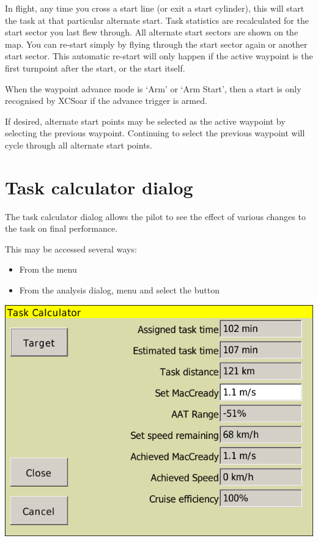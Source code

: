 \documentclass[a4paper,12pt]{refrep}
\begin{document}
  In flight, any time you cross a start line (or exit a start
  cylinder), this will start the task at that particular alternate
  start.  Task statistics are recalculated for the start sector you
  last flew through.  All alternate start sectors are shown on the
  map.  You can re-start simply by flying through the start sector
  again or another start sector.  This automatic re-start will only
  happen if the active waypoint is the first turnpoint after the
  start, or the start itself.

  When the waypoint advance mode is `Arm' or `Arm Start', then a start
  is only recognised by XCSoar if the advance trigger is armed.

  If desired, alternate start points may be selected as the active
  waypoint by selecting the previous waypoint.  Continuing to select
  the previous waypoint will cycle through all alternate start points.

\section{Task calculator dialog}\label{sec:task-calc-dial}
The task calculator dialog allows the pilot to see the effect of
various changes to the task on final performance.

This may be accessed several ways:
\begin{itemize}
\item From the menu 
\begin{quote}
\blink{}
\end{quote}
\item From the analysis dialog, menu \blink{} and select
 the button 
\end{itemize}

\begin{center}
\includegraphics[angle=0,width=\linewidth,keepaspectratio='true']{figures/dialog-taskcalc3.png}
\end{center}
\end{document}
